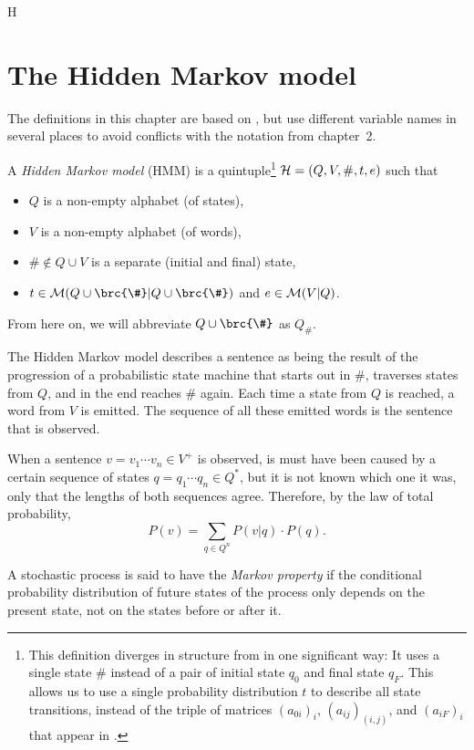 H\chapter{The Hidden Markov model}

The definitions in this chapter are based on \cite[pp.~210]{jm09}, but use
different variable names in several places to avoid conflicts with the notation
from chapter~2.

\begin{definition}
 A \emph{Hidden Markov model} (HMM) is a quintuple\footnote{This definition
 diverges in structure from \cite{jm09} in one significant way: It uses a
 single state $\#$ instead of a pair of initial state $q_0$ and final state
 $q_F$. This allows us to use a single probability distribution $t$ to describe
 all state transitions, instead of the triple of matrices $(a_{0i})_i$,
 $(a_{ij})_{(i,j)}$, and $(a_{iF})_i$ that appear in \cite{jm09}.} $\mathcal H =
 (Q,V,\#,t,e)$ such that
 \begin{itemize}\setlength\itemsep{-0.3em}
  \item $Q$ is a non-empty alphabet (of states),
  \item $V$ is a non-empty alphabet (of words),
  \item $\#\notin Q\cup V$ is a separate (initial and final) state,
  \item $t\in\um(Q\cup\brc{\#}|Q\cup\brc{\#})$ and $e\in\mathcal M(V|Q)$. \qedhere
 \end{itemize}
\end{definition}

From here on, we will abbreviate $Q\cup\brc{\#}$ as $Q_\#$.

The Hidden Markov model describes a sentence as being the result of the
progression of a probabilistic state machine that starts out in $\#$, traverses
states from $Q$, and in the end reaches $\#$ again. Each time a state from $Q$
is reached, a word from $V$ is emitted. The sequence of all these emitted words
is the sentence that is observed.

When a sentence $v = v_1\cdots v_n\in V^+$ is observed, is must have been
caused by a certain sequence of states $q = q_1\cdots q_n\in Q^*$, but it is
not known which one it was, only that the lengths of both sequences agree.
Therefore, by the law of total probability,
\[
 P(v) = \sum_{q\in Q^n} P(v|q) \cdot P(q).
\]

\begin{definition}
 A stochastic process is said to have the \emph{Markov property} if the
 conditional probability distribution of future states of the process only
 depends on the present state, not on the states before or after it.
\end{definition}

